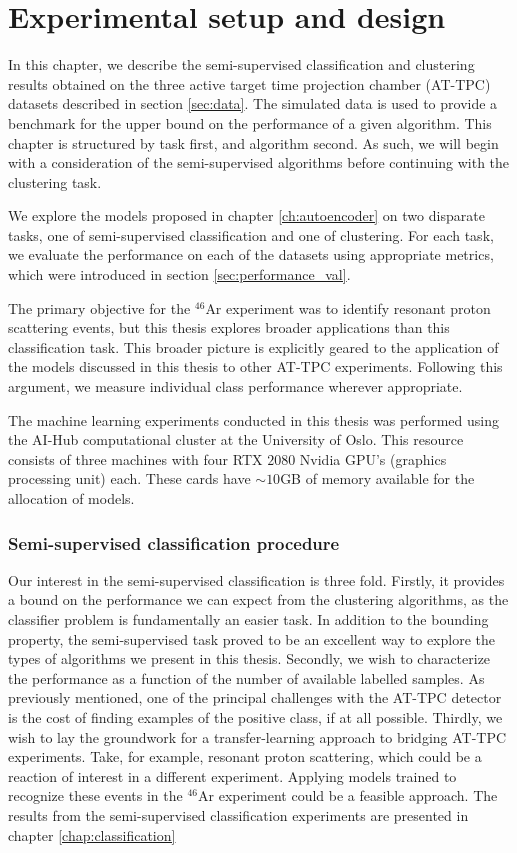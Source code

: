 \chapter{Experimental setup and design}

In this chapter, we describe the semi-supervised classification and clustering results obtained on the three active target time projection chamber (AT-TPC) datasets described in section \ref{sec:data}. The simulated data is used to provide a benchmark for the upper bound on the performance of a given algorithm. This chapter is structured by task first, and algorithm second. As such, we will begin with a consideration of the semi-supervised algorithms before continuing with the clustering task. 

 We explore the models proposed in chapter \ref{ch:autoencoder} on two disparate tasks, one of semi-supervised classification and one of clustering. For each task, we evaluate the performance on each of the datasets using appropriate metrics, which were introduced in section \ref{sec:performance_val}. 

 The primary objective for the ${}^{46}$Ar experiment was to identify resonant proton scattering events, but this thesis explores broader applications than this classification task. This broader picture is explicitly geared to the application of the models discussed in this thesis to other AT-TPC experiments. Following this argument, we measure individual class performance wherever appropriate. 

The machine learning experiments conducted in this thesis was performed using the AI-Hub computational cluster at the University of Oslo.  This resource consists of three machines with four RTX $2080$ Nvidia GPU's (graphics processing unit) each. These cards have $\sim 10$GB of memory available for the allocation of models.

\subsection{Semi-supervised classification procedure}\label{sec:clf_procedure}

Our interest in the semi-supervised classification is three fold. Firstly, it provides a bound on the performance we can expect from the clustering algorithms, as the classifier problem is fundamentally an easier task. In addition to the bounding property, the semi-supervised task proved to be an excellent way to explore the types of algorithms we present in this thesis. Secondly, we wish to characterize the performance as a function of the number of available labelled samples. As previously mentioned, one of the principal challenges with the AT-TPC detector is the cost of finding examples of the positive class, if at all possible. Thirdly, we wish to lay the groundwork for a transfer-learning approach to bridging AT-TPC experiments. Take, for example, resonant proton scattering, which could be a reaction of interest in a different experiment. Applying models trained to recognize these events in the ${}^{46}$Ar experiment could be a feasible approach. The results from the semi-supervised classification experiments are presented in chapter \ref{chap:classification}

